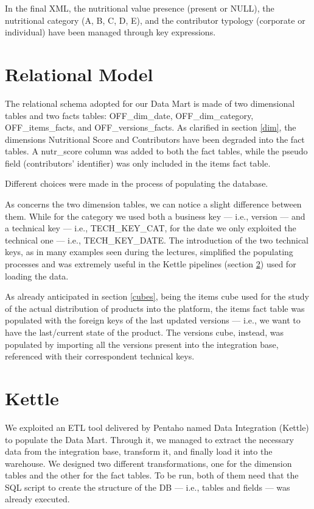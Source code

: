 \documentclass[runningheads]{llncs}
\begin{document}
In the final XML, the nutritional value presence (present or NULL), the nutritional category (A, B, C, D, E), and the contributor typology (corporate or individual) have been managed through key expressions.
 
\section{Relational Model}\label{ER}
The relational schema adopted for our Data Mart is made of two dimensional tables and two facts tables: OFF\_dim\_date, OFF\_dim\_category, OFF\_items\_facts, and OFF\_versions\_facts. 
As clarified in section \ref{dim}, the dimensions Nutritional Score and Contributors have been degraded into the fact tables. A nutr\_score column was added to both the fact tables, while the pseudo field (contributors' identifier) was only included in the items fact table. 

Different choices were made in the process of populating the database.

As concerns the two dimension tables, we can notice a slight difference between them. While for the category we used both a business key — i.e., version — and a technical key — i.e., TECH\_KEY\_CAT, for the date we only exploited the technical one — i.e., TECH\_KEY\_DATE. The introduction of the two technical keys, as in many examples seen during the lectures, simplified the populating processes and was extremely useful in the Kettle pipelines (section \ref{kettle}) used for loading the data.

As already anticipated in section \ref{cubes}, being the items cube used for the study of the actual distribution of products into the platform, the items fact table was populated with the foreign keys of the last updated versions — i.e., we want to have the last/current state of the product. The versions cube, instead, was populated by importing all the versions present into the integration base, referenced with their correspondent technical keys. 

\section{Kettle}\label{kettle}

We exploited an ETL tool delivered by Pentaho named Data Integration (Kettle) to populate the Data Mart. Through it, we managed to extract the necessary data from the integration base, transform it, and finally load it into the warehouse.
We designed two different transformations, one for the dimension tables and the other for the fact tables. To be run, both of them need that the SQL script to create the structure of the DB — i.e., tables and fields — was already executed.
\end{document}
